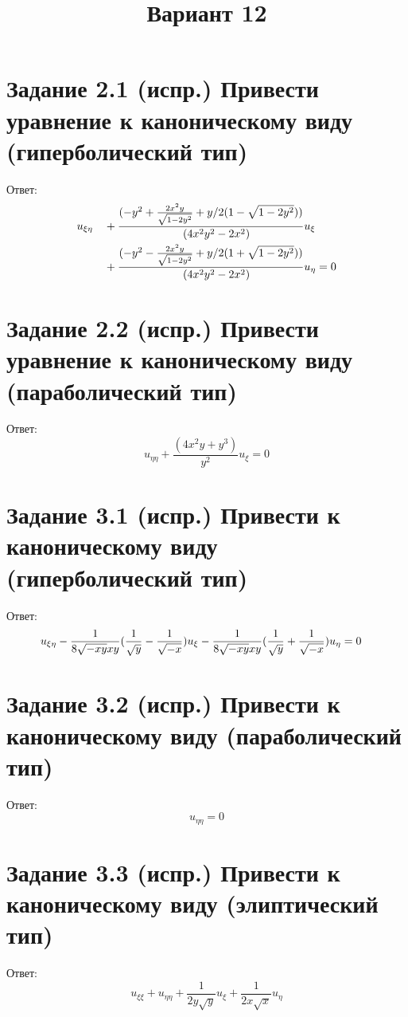 \documentclass[a4paper,12pt]{article}
\begin{document}
\setcounter{page}{1}
\thispagestyle{empty}
\title{Вариант 12}
\date{}
\maketitle
\section*{Задание 2.1 (испр.) Привести уравнение к каноническому виду (гиперболический тип)}
Ответ: \begin{align}
    u_{\xi\eta}
    &\quad+ \frac{(-y^2 + \frac{2x^2y}{\sqrt{1-2y^2}} + y/2(1-\sqrt{1-2y^2}))}{\quad(4x^2y^2 - 2x^2)}u_\xi \notag \\
    &\quad+ \frac{(-y^2 - \frac{2x^2y}{\sqrt{1-2y^2}} + y/2(1+\sqrt{1-2y^2}))}{\quad(4x^2y^2 - 2x^2)}u_\eta = 0 \notag
\end{align} 

\section*{Задание 2.2 (испр.) Привести уравнение к каноническому виду (параболический тип)}
Ответ: $$u_{\eta\eta} + \frac{(4x^2y + y^3)}{y^2}u_\xi = 0$$ 

\section*{Задание 3.1 (испр.) Привести к каноническому виду (гиперболический тип)}
Ответ:
\begin{align}
u_{\xi\eta} \notag
- \frac{1}{8\sqrt{-xy}xy}(\frac{1}{\sqrt{y}} - \frac{1}{\sqrt{-x}})u_\xi \notag 
&- \frac{1}{8\sqrt{-xy}xy}(\frac{1}{\sqrt{y}} + \frac{1}{\sqrt{-x}})u_\eta = 0 \notag
\end{align}

\section*{Задание 3.2 (испр.) Привести к каноническому виду (параболический тип)}
Ответ:
$$u_{\eta\eta} = 0$$

\section*{Задание 3.3 (испр.) Привести к каноническому виду (элиптический тип)}
Ответ:
$$u_{\xi\xi} + u_{\eta\eta} + \frac{1}{2y\sqrt{y}}u_\xi + \frac{1}{2x\sqrt{x}}u_\eta$$
\end{document}

